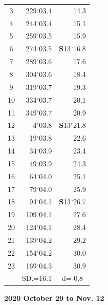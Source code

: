 \documentclass[10pt, a4paper]{report}
\begin{document}
\begin{scriptsize}
\begin{tabular*}{0.2\textwidth}[t]{@{\extracolsep{\fill}}|c|rr|}
3 & 229$^\circ$03.4 & \raisebox{0.24ex}{\boldmath$\cdot$~\boldmath$\cdot$~~}14.3\\
4 & 244$^\circ$03.4 & 15.1\\
5 & 259$^\circ$03.5 & 15.9\\[2Pt]
6 & 274$^\circ$03.5 & \textbf{S}13$^\circ$16.8\\
7 & 289$^\circ$03.6 & 17.6\\
8 & 304$^\circ$03.6 & 18.4\\
9 & 319$^\circ$03.7 & \raisebox{0.24ex}{\boldmath$\cdot$~\boldmath$\cdot$~~}19.3\\
10 & 334$^\circ$03.7 & 20.1\\
11 & 349$^\circ$03.7 & 20.9\\[2Pt]
12 & 4$^\circ$03.8 & \textbf{S}13$^\circ$21.8\\
13 & 19$^\circ$03.8 & 22.6\\
14 & 34$^\circ$03.9 & 23.4\\
15 & 49$^\circ$03.9 & \raisebox{0.24ex}{\boldmath$\cdot$~\boldmath$\cdot$~~}24.3\\
16 & 64$^\circ$04.0 & 25.1\\
17 & 79$^\circ$04.0 & 25.9\\[2Pt]
18 & 94$^\circ$04.1 & \textbf{S}13$^\circ$26.7\\
19 & 109$^\circ$04.1 & 27.6\\
20 & 124$^\circ$04.1 & 28.4\\
21 & 139$^\circ$04.2 & \raisebox{0.24ex}{\boldmath$\cdot$~\boldmath$\cdot$~~}29.2\\
22 & 154$^\circ$04.2 & 30.0\\
23 & 169$^\circ$04.3 & 30.9\\
\hline
\rule{0pt}{2.4ex} & \multicolumn{1}{c}{SD.=16.1} & \multicolumn{1}{c|}{d=-0.8}\\
\hline
\end{tabular*}

\end{scriptsize}
\newpage
\sffamily
\noindent
\begin{flushright}
\textbf{2020 October 29 to Nov. 12}\par
\end{flushright}
\end{document}
